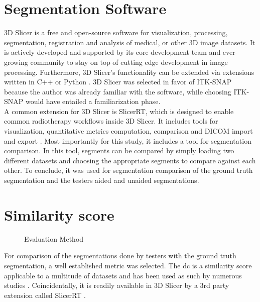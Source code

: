 \section{Segmentation Software}\label{s:segSoftware}
3D Slicer is a free and open-source software for visualization, processing, segmentation, registration and analysis of medical, or other 3D image datasets.
It is actively developed and supported by its core development team and ever-growing community to stay on top of cutting edge development in image processing.
Furthermore, 3D Slicer's functionality can be extended via extensions written in C++ or Python \cite{kikinis3DSlicerPlatform2014}.
3D Slicer was selected in favor of ITK-SNAP because the author was already familiar with the software, while choosing ITK-SNAP would have entailed a familiarization phase.\\
A common extension for 3D Slicer is SlicerRT, which is designed to enable common radiotherapy workflows inside 3D Slicer.
It includes tools for visualization, quantitative metrics computation, comparison and DICOM import and export \cite{pinterSlicerRTRadiationTherapy2012}.
Most importantly for this study, it includes a tool for segmentation comparison.
In this tool, segments can be compared by simply loading two different datasets and choosing the appropriate segments to compare against each other.
To conclude, it was used for segmentation comparison of the ground truth segmentation and the testers aided and unaided segmentations.

\section{Similarity score}\label{s:similarity-score}
\begin{figure}[h!]
	
	\caption{Evaluation Method \cite{wangImageSegmentationEvaluation2020}}\label{fig:eval}
\end{figure}


For comparison of the segmentations done by testers with the ground truth segmentation, a well established metric was selected.
The \acrfull{dc} is a similarity score applicable to a multitude of datasets and has been used as such by numerous studies \cite{setiawanImageSegmentationMetrics2020,atasPerformanceEvaluationJaccardDice2023}.
Coincidentally, it is readily available in 3D Slicer by a 3rd party extension called SlicerRT \cite{pinterSlicerRTRadiationTherapy2012}.

